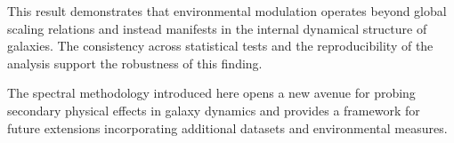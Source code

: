 This result demonstrates that environmental modulation operates beyond global scaling relations and instead manifests in the internal dynamical structure of galaxies. The consistency across statistical tests and the reproducibility of the analysis support the robustness of this finding.

The spectral methodology introduced here opens a new avenue for probing secondary physical effects in galaxy dynamics and provides a framework for future extensions incorporating additional datasets and environmental measures.
